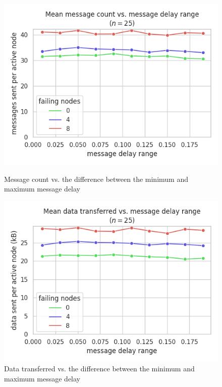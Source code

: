 \begin{figure}[H]
    \centering
    \begin{minipage}{0.5\textwidth}
        \centering
        \includegraphics[width=\textwidth]{figures/10/bandwidth_msg_tx_sum_by_delay_range.png}
        \captionsetup{labelformat=empty}
        \caption{Message count vs. the difference between the minimum and maximum message delay}
    \end{minipage}\hfill
    \begin{minipage}{0.5\textwidth}
        \centering
        \includegraphics[width=\textwidth]{figures/10/bandwidth_tx_sum_by_delay_range.png}
        \captionsetup{labelformat=empty}
        \caption{Data transferred vs. the difference between the minimum and maximum message delay}
    \end{minipage}\hfill
\end{figure}


\newpage
\raggedright



